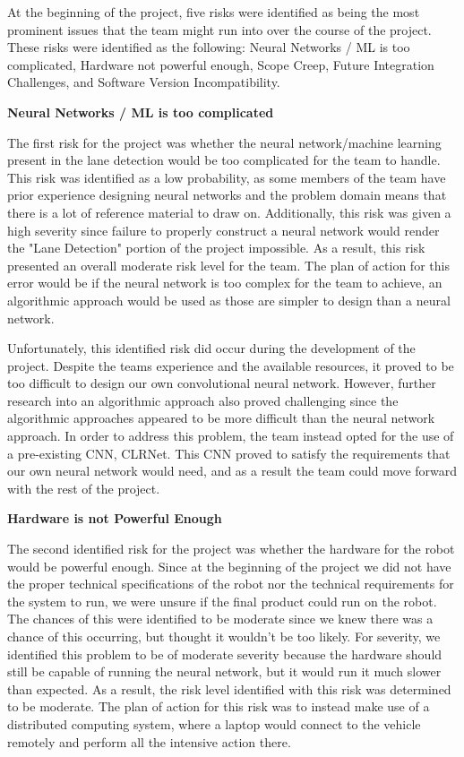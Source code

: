 \documentclass[titlepage,draft]{article}
\begin{document}
At the beginning of the project, five risks were identified as being the most prominent issues that the team might run into over the course of the project. These risks were identified as the following: Neural Networks / ML is too complicated, Hardware not powerful enough, Scope Creep, Future Integration Challenges, and Software Version Incompatibility.

\textbf{Neural Networks / ML is too complicated}

The first risk for the project was whether the neural network/machine learning present in the lane detection would be too complicated for the team to handle. This risk was identified as a low probability, as some members of the team have prior experience designing neural networks and the problem domain means that there is a lot of reference material to draw on. Additionally, this risk was given a high severity since failure to properly construct a neural network would render the "Lane Detection" portion of the project impossible. As a result, this risk presented an overall moderate risk level for the team. The plan of action for this error would be if the neural network is too complex for the team to achieve, an algorithmic approach would be used as those are simpler to design than a neural network.

Unfortunately, this identified risk did occur during the development of the project. Despite the teams experience and the available resources, it proved to be too difficult to design our own convolutional neural network. However, further research into an algorithmic approach also proved challenging since the algorithmic approaches appeared to be more difficult than the neural network approach. In order to address this problem, the team instead opted for the use of a pre-existing CNN, CLRNet. This CNN proved to satisfy the requirements that our own neural network would need, and as a result the team could move forward with the rest of the project.

\textbf{Hardware is not Powerful Enough}

The second identified risk for the project was whether the hardware for the robot would be powerful enough. Since at the beginning of the project we did not have the proper technical specifications of the robot nor the technical requirements for the system to run, we were unsure if the final product could run on the robot. The chances of this were identified to be moderate since we knew there was a chance of this occurring, but thought it wouldn't be too likely. For severity, we identified this problem to be of moderate severity because the hardware should still be capable of running the neural network, but it would run it much slower than expected. As a result, the risk level identified with this risk was determined to be moderate. The plan of action for this risk was to instead make use of a distributed computing system, where a laptop would connect to the vehicle remotely and perform all the intensive action there.
\end{document}
